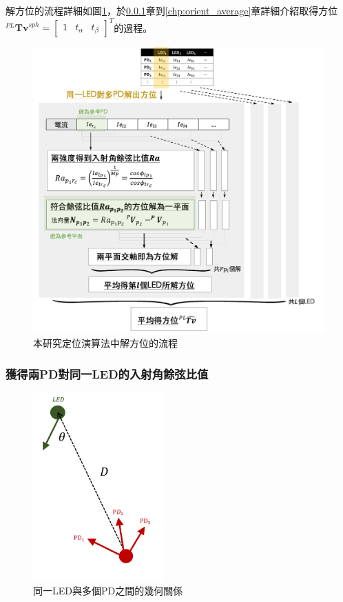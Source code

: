     解方位的流程詳細如圖\ref{pic:orient_flow}，於\ref{chp:cosine_ratio}章到\ref{chp:orient_average}章詳細介紹取得方位$^{PL}\boldsymbol{Tv}^{sph} = \left[\begin{array}{ccc}1&t_{\alpha}&t_{\beta}\end{array}\right]^T$的過程。

    \begin{figure}[h!]
        \centering
        \includegraphics[width=14cm]{ch3pic/orient_flow.png}
        \caption{本研究定位演算法中解方位的流程}
        \label{pic:orient_flow}
    \end{figure}

    \subsubsection{獲得兩PD對同一LED的入射角餘弦比值}
    \label{chp:cosine_ratio}

        \begin{figure}[h!]
            \centering
            \includegraphics[width=5cm]{ch3pic/1led_mulpd.png}
            \caption{同一LED與多個PD之間的幾何關係}
            \label{pic:1led_mulpd}
        \end{figure}

